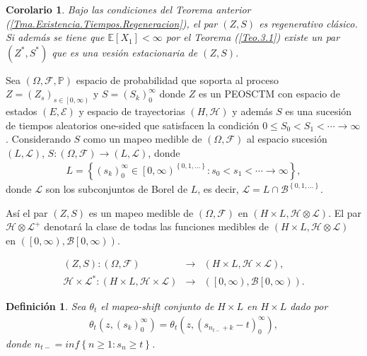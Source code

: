 \documentclass{article}
\newtheorem{Def}{Definición}[section]
\newtheorem{Cor}{Corolario}%
\newcommand{\esp}{\mathbb{E}}
\newcommand{\prob}{\mathbb{P}}
\numberwithin{equation}{section}
\begin{document}
\begin{Cor}\label{Tma.Estacionariedad}
Bajo las condiciones del Teorema anterior (\ref{Tma.Existencia.Tiempos.Regeneracion}), el par $\left(Z,S\right)$ es regenerativo cl\'asico. Si adem\'as se tiene que $\esp\left[X_{1}\right]<\infty$ por el Teorema (\ref{Teo.3.1}) existe un par $\left(Z^{*},S^{*}\right)$ que es una vesi\'on estacionaria de $\left(Z,S\right)$.
\end{Cor}

Sea $\left(\Omega,\mathcal{F},\prob\right)$ espacio de probabilidad que soporta al proceso $Z=\left(Z_{s}\right)_{s\in\left[0,\infty\right)}$ y $S=\left(S_{k}\right)_{0}^{\infty}$ donde $Z$ es un PEOSCTM con espacio de estados $\left(E,\mathcal{E}\right)$  y espacio de trayectorias $\left(H,\mathcal{H}\right)$  y adem\'as $S$ es una sucesi\'on de tiempos aleatorios one-sided que satisfacen la condici\'on $0\leq S_{0}<S_{1}<\cdots\rightarrow\infty$. Considerando $S$ como un mapeo medible de $\left(\Omega,\mathcal{F}\right)$ al espacio sucesi\'on $\left(L,\mathcal{L}\right)$, $S:\left(\Omega,\mathcal{F}\right)\rightarrow\left(L,\mathcal{L}\right)$, donde 
\begin{eqnarray*}
L=\left\{\left(s_{k}\right)_{0}^{\infty}\in\left[0,\infty\right)^{\left\{0,1,\ldots\right\}}:s_{0}<s_{1}<\cdots\rightarrow\infty\right\},
\end{eqnarray*}
donde $\mathcal{L}$ son los subconjuntos de Borel de $L$, es decir, $\mathcal{L}=L\cap\mathcal{B}^{\left\{0,1,\ldots\right\}}$.

As\'i el par $\left(Z,S\right)$ es un mapeo medible de  $\left(\Omega,\mathcal{F}\right)$ en $\left(H\times L,\mathcal{H}\otimes\mathcal{L}\right)$. El par $\mathcal{H}\otimes\mathcal{L}^{+}$ denotar\'a la clase de todas las funciones medibles de $\left(H\times L,\mathcal{H}\otimes\mathcal{L}\right)$ en $\left(\left[0,\infty\right),\mathcal{B}\left[0,\infty\right)\right)$.

\begin{eqnarray*}
\left(Z,S\right):\left(\Omega,\mathcal{F}\right)&\rightarrow& \left(H\times L,\mathcal{H}\times\mathcal{L}\right),\\
\mathcal{H}\times\mathcal{L}^{*}:\left(H\times L,\mathcal{H}\times\mathcal{L}\right)
&\rightarrow& 
\left(\left[0,\infty\right),\mathcal{B}\left[0,\infty\right)\right).
\end{eqnarray*}

\begin{Def}
Sea $\theta_{t}$ el mapeo-shift conjunto de $H\times L$ en $H\times L$ dado por
\begin{eqnarray*}
\theta_{t}\left(z,\left(s_{k}\right)_{0}^{\infty}\right)=\theta_{t}\left(z,\left(s_{n_{t-}+k}-t\right)_{0}^{\infty}\right),
\end{eqnarray*}
donde 
$n_{t-}=inf\left\{n\geq1:s_{n}\geq t\right\}$.
\end{Def}
\end{document}

